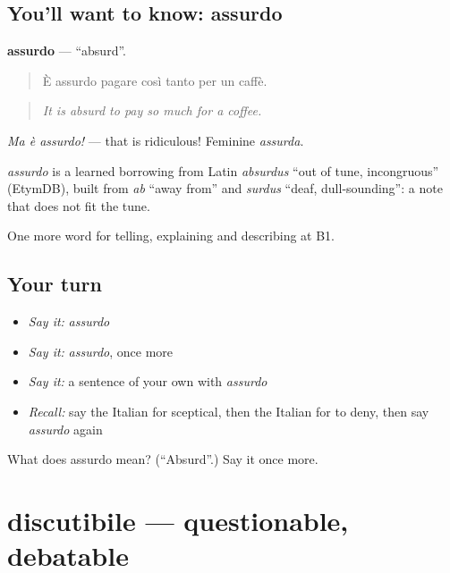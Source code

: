 \subsection*{You'll want to know: assurdo}
\textbf{assurdo} — \textquotedblleft{}absurd\textquotedblright{}.

\begin{quote}
È assurdo pagare così tanto per un caffè.
\end{quote}

\begin{quote}
\emph{It is absurd to pay so much for a coffee.}
\end{quote}

\emph{Ma è assurdo!} — that is ridiculous! Feminine \emph{assurda}.

\begin{cousinweb}
\emph{assurdo} is a learned borrowing from Latin \emph{absurdus} \textquotedblleft{}out of tune, incongruous\textquotedblright{} (EtymDB), built from \emph{ab} \textquotedblleft{}away from\textquotedblright{} and \emph{surdus} \textquotedblleft{}deaf, dull-sounding\textquotedblright{}: a note that does not fit the tune.
\end{cousinweb}

\begin{grammarlens}[title={What you've built}]
One more word for telling, explaining and describing at B1.
\end{grammarlens}

\subsection*{Your turn}
\begin{itemize}
\raggedright
  \item \emph{Say it:} \emph{assurdo}
  \item \emph{Say it:} \emph{assurdo}, once more
  \item \emph{Say it:} a sentence of your own with \emph{assurdo}
  \item \emph{Recall:} say the Italian for sceptical, then the Italian for to deny, then say \emph{assurdo} again
\end{itemize}

\begin{tcolorbox}[breakable,colback=teal!4,colframe=teal!35!black,title={Before you move on}]
What does assurdo mean? (\textquotedblleft{}Absurd\textquotedblright{}.) Say it once more.
\end{tcolorbox}
\section[discutibile]{discutibile — questionable, debatable}

